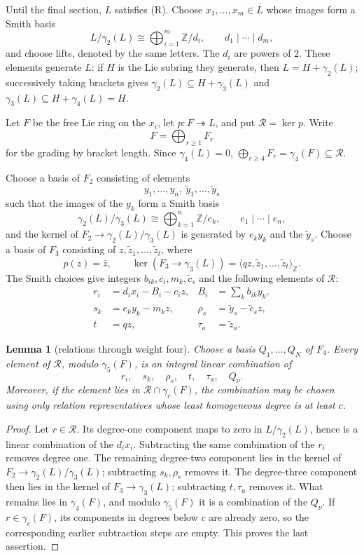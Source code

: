 \documentclass[11pt]{amsart}
\newtheorem{lemma}[theorem]{Lemma}
\theoremstyle{definition}
\theoremstyle{remark}
\newcommand{\Z}{\mathbb Z}
\newcommand{\gam}{\gamma}
\begin{document}
Until the final section, \(L\) satisfies \textup{(R)}.  Choose
\(x_1,\ldots,x_m\in L\) whose images form a Smith basis
\[
 L/\gam_2(L)\cong\bigoplus_{i=1}^m\Z/d_i,
 \qquad d_1\mid\cdots\mid d_m,
\]
and choose lifts, denoted by the same letters.  The \(d_i\) are powers
of \(2\).  These elements generate \(L\): if \(H\) is the Lie subring
they generate, then \(L=H+\gam_2(L)\); successively taking brackets
gives \(\gam_2(L)\subseteq H+\gam_3(L)\) and
\(\gam_3(L)\subseteq H+\gam_4(L)=H\).

Let \(F\) be the free Lie ring on the \(x_i\), let
\(p:F\twoheadrightarrow L\), and put
\(\mathcal R=\ker p\).  Write
\[
                         F=\bigoplus_{r\geq1}F_r
\]
for the grading by bracket length.  Since \(\gam_4(L)=0\),
\(\bigoplus_{r\geq4}F_r=\gam_4(F)\subseteq\mathcal R\).

Choose a basis of \(F_2\) consisting of elements
\[
 y_1,\ldots,y_n,\ \widetilde y_1,\ldots,\widetilde y_s
\]
such that the images of the \(y_k\) form a Smith basis
\[
 \gam_2(L)/\gam_3(L)\cong\bigoplus_{k=1}^n\Z/e_k,
 \qquad e_1\mid\cdots\mid e_n,
\]
and the kernel of \(F_2\to\gam_2(L)/\gam_3(L)\) is generated by
\(e_ky_k\) and the \(\widetilde y_s\).  Choose a basis of \(F_3\)
consisting of \(z,\widetilde z_1,\ldots,\widetilde z_t\), where
\[
 p(z)=\bar z,\qquad
 \ker(F_3\to\gam_3(L))
   =\langle qz,\widetilde z_1,\ldots,\widetilde z_t\rangle_{\Z}.
\]
The Smith choices give integers \(b_{ik},c_i,m_k,\widetilde c_s\)
and the following elements of \(\mathcal R\):
\begin{align}
 r_i&=d_ix_i-B_i-c_iz,
       &B_i&=\sum_k b_{ik}y_k, \label{eq:ri}\\
 s_k&=e_ky_k-m_kz, &
 \rho_s&=\widetilde y_s-\widetilde c_sz, \label{eq:sk}\\
 t&=qz, &
 \tau_a&=\widetilde z_a. \label{eq:t}
\end{align}

\begin{lemma}[relations through weight four]\label{lem:relations}
Choose a basis \(Q_1,\ldots,Q_N\) of \(F_4\).  Every element of
\(\mathcal R\), modulo \(\gam_5(F)\), is an integral linear
combination of
\[
 r_i,\quad s_k,\quad\rho_s,\quad t,\quad\tau_a,\quad Q_\nu .
\]
Moreover, if the element lies in
\(\mathcal R\cap\gam_c(F)\), the combination may be chosen using only
relation representatives whose least homogeneous degree is at least
\(c\).
\end{lemma}

\begin{proof}
Let \(r\in\mathcal R\).  Its degree-one component maps to zero in
\(L/\gam_2(L)\), hence is a linear combination of the \(d_ix_i\).
Subtracting the same combination of the \(r_i\) removes degree one.
The remaining degree-two component lies in the kernel of
\(F_2\to\gam_2(L)/\gam_3(L)\); subtracting \(s_k,\rho_s\) removes it.
The degree-three component then lies in the kernel of
\(F_3\to\gam_3(L)\); subtracting \(t,\tau_a\) removes it.  What remains
lies in \(\gam_4(F)\), and modulo \(\gam_5(F)\) it is a combination of
the \(Q_\nu\).  If \(r\in\gam_c(F)\), its components in degrees below
\(c\) are already zero, so the corresponding earlier subtraction
steps are empty.  This proves the last assertion.
\end{proof}
\end{document}
